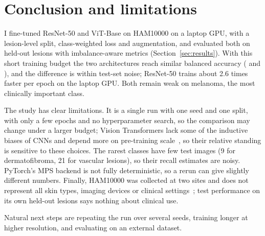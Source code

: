 \section{Conclusion and limitations}
I fine-tuned ResNet-50 and ViT-Base on HAM10000 on a laptop GPU, with a lesion-level split, class-weighted loss and augmentation, and evaluated both on held-out lesions with imbalance-aware metrics (Section~\ref{sec:results}).
With this short training budget the two architectures reach similar balanced accuracy (\resnetTestBacc{} and \vitTestBacc{}), and the difference is within test-set noise; ResNet-50 trains about 2.6 times faster per epoch on the laptop GPU.
Both remain weak on melanoma, the most clinically important class.

The study has clear limitations.
It is a single run with one seed and one split, with only a few epochs and no hyperparameter search, so the comparison may change under a larger budget; Vision Transformers lack some of the inductive biases of CNNs and depend more on pre-training scale~\cite{dosovitskiy2021image}, so their relative standing is sensitive to these choices.
The rarest classes have few test images (9 for dermatofibroma, 21 for vascular lesions), so their recall estimates are noisy.
PyTorch's MPS backend is not fully deterministic, so a rerun can give slightly different numbers.
Finally, HAM10000 was collected at two sites and does not represent all skin types, imaging devices or clinical settings~\cite{tschandl2018ham10000}; test performance on its own held-out lesions says nothing about clinical use.

Natural next steps are repeating the run over several seeds, training longer at higher resolution, and evaluating on an external dataset.
